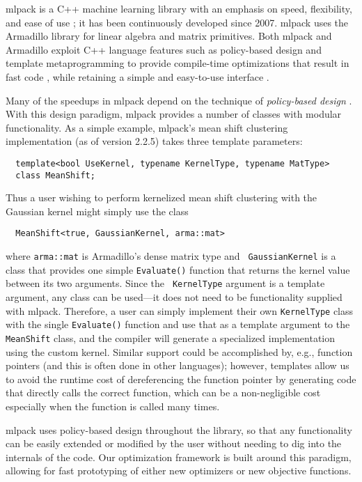 \documentclass{article}
\begin{document}
mlpack is a C++ machine learning library with an emphasis on speed, flexibility,
and ease of use \cite{mlpack2013}; it has been continuously developed since
2007.  mlpack uses the Armadillo library \cite{sanderson2016armadillo} for
linear algebra and matrix primitives.  Both mlpack and Armadillo exploit C++
language features such as policy-based design and template metaprogramming to
provide compile-time optimizations that result in fast code \cite{pasc2017},
while retaining a simple and easy-to-use interface \cite{icopust2017}.

Many of the speedups in mlpack depend on the technique of {\it policy-based
design} \cite{Alexandrescu2001}.  With this design paradigm, mlpack
provides a number of classes with modular functionality.  As a simple example,
mlpack's mean shift clustering implementation (as of version 2.2.5) takes three
template parameters:

\begin{verbatim}
  template<bool UseKernel, typename KernelType, typename MatType>
  class MeanShift;
\end{verbatim}

Thus a user wishing to perform kernelized mean shift clustering with the
Gaussian kernel might simply use the class

\begin{verbatim}
  MeanShift<true, GaussianKernel, arma::mat>
\end{verbatim}

\noindent where {\tt arma::mat} is Armadillo's dense matrix type and {\tt
GaussianKernel} is a class that provides one simple {\tt Evaluate()} function
that returns the kernel value between its two arguments.  Since the {\tt
KernelType} argument is a template argument, any class can be used---it does not
need to be functionality supplied with mlpack.  Therefore, a user can simply
implement their own {\tt KernelType} class with the single {\tt Evaluate()}
function and use that as a template argument to the {\tt MeanShift} class, and
the compiler will generate a specialized implementation using the custom kernel.
Similar support could be accomplished by, e.g., function pointers (and this is
often done in other languages); however, templates allow us to avoid the runtime
cost of dereferencing the function pointer by generating code that directly
calls the correct function, which can be a non-negligible cost especially when
the function is called many times.

mlpack uses policy-based design throughout the library, so that any
functionality can be easily extended or modified by the user without needing to
dig into the internals of the code.  Our optimization framework is built around
this paradigm, allowing for fast prototyping of either new optimizers or new
objective functions.
\end{document}
